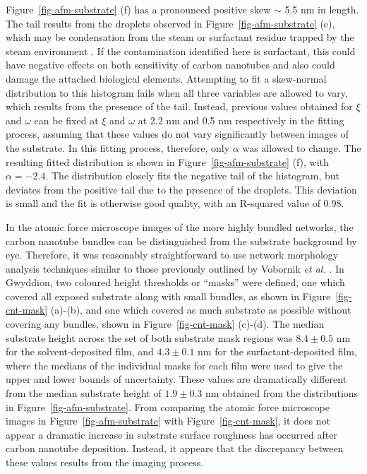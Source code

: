 \documentclass[
  a4paper,
]{scrbook}
\begin{document}
Figure~\ref{fig-afm-substrate} (f) has a pronounced positive skew
\(\sim\) 5.5 nm in length. The tail results from the droplets observed
in Figure~\ref{fig-afm-substrate} (e), which may be condensation from
the steam or surfactant residue trapped by the steam environment
\autocite{Christensen2022,Vobornik2023}. If the contamination identified
here is surfactant, this could have negative effects on both sensitivity
of carbon nanotubes and also could damage the attached biological
elements. Attempting to fit a skew-normal distribution to this histogram
fails when all three variables are allowed to vary, which results from
the presence of the tail. Instead, previous values obtained for \(\xi\)
and \(\omega\) can be fixed at \(\xi\) and \(\omega\) at 2.2 nm and 0.5
nm respectively in the fitting process, assuming that these values do
not vary significantly between images of the substrate. In this fitting
process, therefore, only \(\alpha\) was allowed to change. The resulting
fitted distribution is shown in Figure~\ref{fig-afm-substrate} (f), with
\(\alpha = -2.4\). The distribution closely fits the negative tail of
the histogram, but deviates from the positive tail due to the presence
of the droplets. This deviation is small and the fit is otherwise good
quality, with an R-squared value of 0.98.

In the atomic force microscope images of the more highly bundled
networks, the carbon nanotube bundles can be distinguished from the
substrate background by eye. Therefore, it was reasonably
straightforward to use network morphology analysis techniques similar to
those previously outlined by Vobornik \emph{et al.}
\autocite{Vobornik2023}. In Gwyddion, two coloured height thresholds or
``masks'' were defined, one which covered all exposed substrate along
with small bundles, as shown in Figure~\ref{fig-cnt-mask} (a)-(b), and
one which covered as much substrate as possible without covering any
bundles, shown in Figure~\ref{fig-cnt-mask} (c)-(d). The median
substrate height across the set of both substrate mask regions was
\(8.4 \pm 0.5\) nm for the solvent-deposited film, and \(4.3 \pm 0.1\)
nm for the surfactant-deposited film, where the medians of the
individual masks for each film were used to give the upper and lower
bounds of uncertainty. These values are dramatically different from the
median substrate height of \(1.9 \pm 0.3\) nm obtained from the
distributions in Figure~\ref{fig-afm-substrate}. From comparing the
atomic force microscope images in Figure~\ref{fig-afm-substrate} with
Figure~\ref{fig-cnt-mask}, it does not appear a dramatic increase in
substrate surface roughness has occurred after carbon nanotube
deposition. Instead, it appears that the discrepancy between these
values results from the imaging process.
\end{document}
